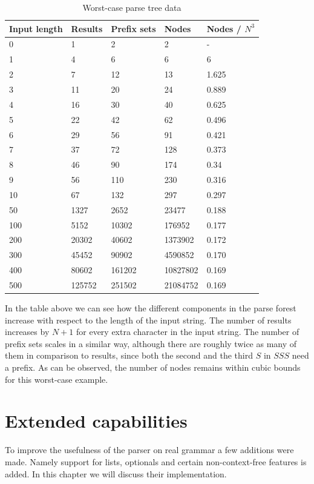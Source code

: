\documentclass[a4paper,10pt]{article}
\begin{document}
\begin{table}[H]
\centering
\begin{tabular}{ | p{6em} | p{4em} | p{5em} | p{4em} | p{5em} | }
  \hline
  Input length & Results & Prefix sets & Nodes & Nodes / $N^3$ \\
  \hline
  0 & 1 & 2 & 2 & - \\
  1 & 4 & 6 & 6 & 6 \\
  2 & 7 & 12 & 13 & 1.625 \\
  3 & 11 & 20 & 24 & 0.889 \\
  4 & 16 & 30 & 40 & 0.625 \\
  5 & 22 & 42 & 62 & 0.496 \\
  6 & 29 & 56 & 91 & 0.421 \\
  7 & 37 & 72 & 128 & 0.373 \\
  8 & 46 & 90 & 174 & 0.34 \\
  9 & 56 & 110 & 230 & 0.316 \\
  10 & 67 & 132 & 297 & 0.297 \\
  \hline
  50 & 1327 & 2652 & 23477 & 0.188 \\
  100 & 5152 & 10302 & 176952 & 0.177 \\
  200 & 20302 & 40602 & 1373902 & 0.172 \\
  300 & 45452 & 90902 & 4590852 & 0.170 \\
  400 & 80602 & 161202 & 10827802 & 0.169 \\
  500 & 125752 & 251502 & 21084752 & 0.169 \\
  \hline
\end{tabular}
\caption{Worst-case parse tree data}
\end{table}

In the table above we can see how the different components in the parse forest increase with respect to the length of the input string. The number of results increases by $N + 1$ for every extra character in the input string. The number of prefix sets scales in a similar way, although there are roughly twice as many of them in comparison to results, since both the second and the third $S$ in $SSS$ need a prefix. As can be observed, the number of nodes remains within cubic bounds for this worst-case example.

\section{Extended capabilities}

To improve the usefulness of the parser on real grammar a few additions were made. Namely support for lists, optionals and certain non-context-free features is added. In this chapter we will discuss their implementation.
\end{document}
